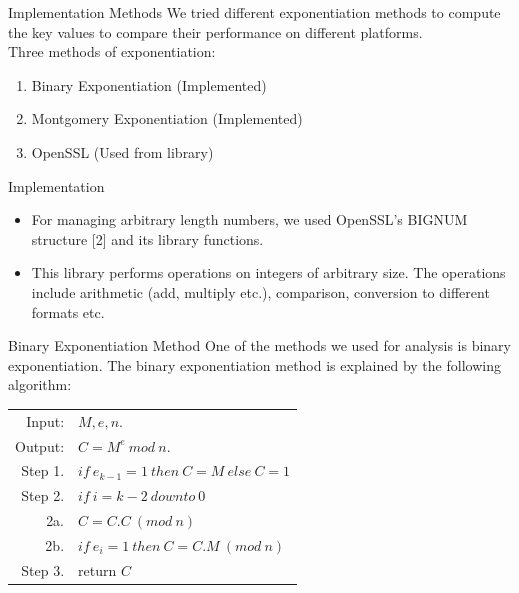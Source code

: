 \documentclass[xcolor=dvipsnames]{beamer}
\begin{document}
\begin{frame}{Implementation Methods}
We tried different exponentiation methods to compute the key values to compare their performance on different platforms.\\
\medskip
Three methods of exponentiation:\\
\begin{enumerate}
\item Binary Exponentiation (Implemented)
\item Montgomery Exponentiation (Implemented)
\item OpenSSL (Used from library)
\end{enumerate}
\end{frame}

\begin{frame}{Implementation}
\begin{itemize}
\item For managing arbitrary length numbers, we used OpenSSL's BIGNUM structure [2] and its library functions.
\medskip
\item This library performs operations on integers of arbitrary size. The operations include arithmetic (add, multiply etc.), comparison, conversion to different formats etc.
\end{itemize}
\end{frame}

\begin{frame}{Binary Exponentiation Method}
One of the methods we used for analysis is binary exponentiation. The binary exponentiation method is explained by the following algorithm:\\
\medskip
\begin{tabular}{rl}
Input: & $M,e,n.$\\
Output: & $C = M^e \ mod \ n.$\\
Step 1. &$if \ e_{k-1} = 1 \ then \ C=M \ else \ C=1$\\
Step 2. &$if \ i = k-2 \ downto \ 0$\\
2a. & \hspace{5mm}$C = C.C \ (mod \ n )$\\
2b.  & \hspace{5mm}$ if \ e_i=1 \ then \ C=C.M \ (mod \ n) $\\
Step 3. & return $C$\\
\end{tabular}
\end{frame}
\end{document}
